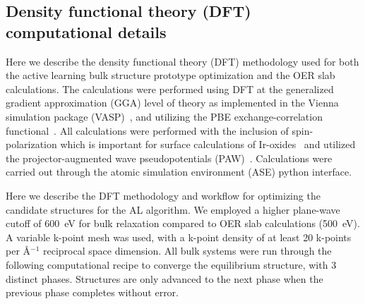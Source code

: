 


\subsection{Density functional theory (DFT) computational details}
%

%
Here we describe the density functional theory (DFT) methodology used for both the active learning bulk structure prototype optimization and the OER slab calculations.
%
The calculations were performed using DFT at the generalized gradient approximation (GGA) level of theory as implemented in the Vienna  simulation package (VASP)~\cite{Kresse1995,Kresse1996_0,Kresse1996_1},
and utilizing the PBE exchange-correlation functional~\cite{Perdew1996}.
%
All calculations were performed with the inclusion of spin-polarization which is important for surface calculations of Ir-oxides~\cite{Briquet2017,Strickler2019} and utilized the projector-augmented wave pseudopotentials (PAW)~\cite{Blochl1994}.
%
Calculations were carried out through the atomic simulation environment (ASE) python interface.~\cite{HjorthLarsen2017}
%


%
Here we describe the DFT methodology and workflow for optimizing the candidate structures for the AL algorithm.
%
We employed a higher plane-wave cutoff of \SI{600}{\electronvolt} for bulk relaxation compared to OER slab calculations (\SI{500}{\electronvolt}).
%
A variable k-point mesh was used, with a k-point density of at least \num{20} k-points per \AA$^{-1}$ reciprocal space dimension.
%
All bulk systems were run through the following computational recipe to converge the equilibrium structure, with \num{3} distinct phases. Structures are only advanced to the next phase when the previous phase completes without error.

